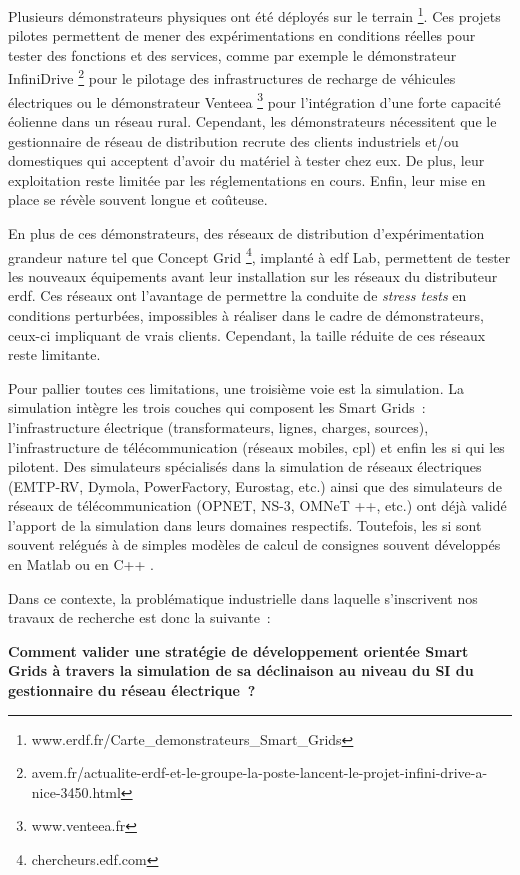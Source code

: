 Plusieurs démonstrateurs physiques ont été déployés sur le terrain 
\footnote{www.erdf.fr/Carte\_demonstrateurs\_Smart\_Grids}. Ces projets pilotes 
permettent de mener des expérimentations en conditions réelles pour tester des 
fonctions et des services, comme par exemple le démonstrateur InfiniDrive 
\footnote{avem.fr/actualite-erdf-et-le-groupe-la-poste-lancent-le-projet-infini-drive-a-nice-3450.html} 
pour le pilotage des infrastructures de recharge de véhicules électriques ou le 
démonstrateur Venteea \footnote{www.venteea.fr} pour l'intégration d'une forte 
capacité éolienne dans un réseau rural. Cependant, les démonstrateurs 
nécessitent que le gestionnaire de réseau de distribution recrute des clients 
industriels et/ou domestiques qui acceptent d'avoir du matériel à tester chez 
eux. De plus, leur exploitation reste limitée par les réglementations en cours. 
Enfin, leur mise en place se révèle souvent longue et coûteuse. 

En plus de ces démonstrateurs, des réseaux de distribution d'expérimentation 
grandeur nature tel que Concept Grid \footnote{chercheurs.edf.com}, implanté à 
\gls{edf} Lab, permettent de tester les nouveaux équipements avant leur 
installation sur les réseaux du distributeur \gls{erdf}. Ces réseaux ont 
l'avantage de permettre la conduite de \textit{stress tests} en conditions perturbées, 
impossibles à réaliser dans le cadre de démonstrateurs, ceux-ci impliquant de 
vrais clients. Cependant, la taille réduite de ces réseaux reste limitante. 

Pour pallier toutes ces limitations, une troisième voie est la simulation. La 
simulation intègre les trois couches qui composent les Smart Grids~: 
l'infrastructure électrique (transformateurs, lignes, charges, sources), 
l'infrastructure de télécommunication (réseaux mobiles, \gls{cpl}) et enfin les 
\gls{si} qui 
les pilotent. Des simulateurs spécialisés dans la simulation de réseaux 
électriques (EMTP-RV, Dymola, PowerFactory, Eurostag, etc.) ainsi que des 
simulateurs de réseaux de télécommunication (OPNET, NS-3, OMNeT ++, etc.) ont 
déjà validé l'apport de la simulation dans leurs domaines respectifs. Toutefois, 
les \gls{si} sont souvent relégués à de simples modèles de calcul de consignes 
souvent 
développés en Matlab ou en C++ \cite{palensky2014simulating}. 

Dans ce contexte, la problématique industrielle dans laquelle  s'inscrivent nos 
travaux de recherche est donc la suivante~: 

\textbf{Comment valider une stratégie de développement orientée Smart Grids à 
travers la simulation de sa déclinaison au niveau du SI du gestionnaire du 
réseau électrique~?}

